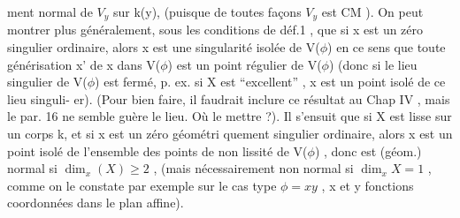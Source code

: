 
ment normal de $V_y$ sur k(y), (puisque de toutes façons   $V_y$ est CM ).
On peut montrer  plus généralement, sous les conditions de déf.1 , que si
x est un zéro singulier ordinaire, alors x est une singularité isolée
de V($\phi$)  en ce sens que toute générisation  x' de x dans V($\phi$) est un
point régulier de V($\phi$)  (donc si le lieu singulier de V($\phi$) est fermé, p.
ex. si X est ``excellent'' , x est  un point isolé de ce lieu singuli-%
er).  (Pour bien faire, il faudrait inclure ce résultat au Chap
IV , mais  le par. 16 ne semble guère le lieu. Où le mettre ?).  Il
s'ensuit que si X est lisse sur un corps k, et si x est un zéro géométri%
quement singulier ordinaire, alors  x est un point isolé de l'ensemble
des points de non lissité  de V($\phi$) , donc est (géom.) normal si  $\dim_x(X) \geqslant 2$ ,
(mais nécessairement non normal si $\dim_x X = 1$ , comme on le  constate par exemple sur
le cas type $\phi = xy$ , x et y fonctions coordonnées dans le plan affine).



